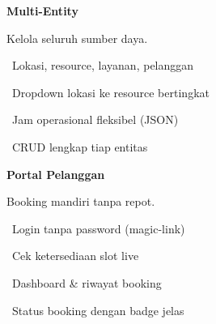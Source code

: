 \documentclass[a4paper]{article}
\begin{document}
\vspace{8pt}

\noindent
\begin{minipage}[t]{0.485\textwidth}
    \colorbox{PurplePrimary}{%
        \begin{minipage}{\dimexpr\textwidth-2\fboxsep\relax}
            {\fontsize{10}{13}\selectfont\bfseries\color{White} Multi-Entity}
        \end{minipage}}\par
    \vspace{4pt}
    {\fontsize{9}{12}\selectfont\color{TextDark}%
    Kelola seluruh sumber daya.\par\vspace{3pt}
    \textbullet\ Lokasi, resource, layanan, pelanggan\par\vspace{2pt}%
    \textbullet\ Dropdown lokasi ke resource bertingkat\par\vspace{2pt}%
    \textbullet\ Jam operasional fleksibel (JSON)\par\vspace{2pt}%
    \textbullet\ CRUD lengkap tiap entitas}%

\end{minipage}%
\hfill
\begin{minipage}[t]{0.485\textwidth}
    \colorbox{BlueDark}{%
        \begin{minipage}{\dimexpr\textwidth-2\fboxsep\relax}
            {\fontsize{10}{13}\selectfont\bfseries\color{White} Portal Pelanggan}
        \end{minipage}}\par
    \vspace{4pt}
    {\fontsize{9}{12}\selectfont\color{TextDark}%
    Booking mandiri tanpa repot.\par\vspace{3pt}
    \textbullet\ Login tanpa password (magic-link)\par\vspace{2pt}%
    \textbullet\ Cek ketersediaan slot live\par\vspace{2pt}%
    \textbullet\ Dashboard \& riwayat booking\par\vspace{2pt}%
    \textbullet\ Status booking dengan badge jelas}%

\end{minipage}

\vspace{8pt}
\end{document}

